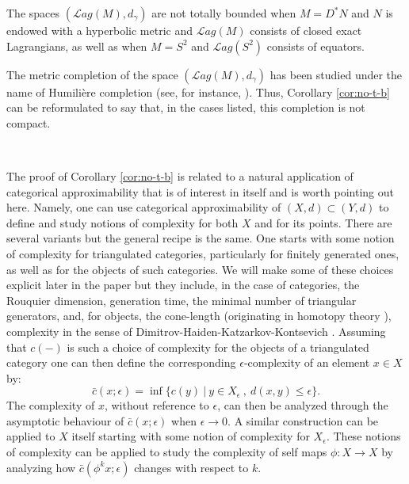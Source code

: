 \begin{cor}\label{cor:no-t-b} The spaces $(\mathcal{L}ag(M),d_{\gamma})$ are not totally bounded when
$M=D^{\ast}N$ and $N$ is endowed with a hyperbolic metric and $\mathcal{L}ag(M)$ consists of closed exact Lagrangians, as well as when $M=S^{2}$ and $\mathcal{L}ag(S^{2})$ consists of equators.
\end{cor}

The metric completion  of the space $(\mathcal{L}ag(M),d_{\gamma})$ has been studied under 
the name of Humili\`ere completion (see, for instance, \cite{AGHI:micro}). Thus, Corollary \ref{cor:no-t-b} can be reformulated to say that, in the cases listed, this completion is not compact.

\

The proof of Corollary \ref{cor:no-t-b} is related to a natural application of categorical approximability that is of interest in itself and is worth pointing out here. Namely, one can use categorical approximability of $(X,d)\subset (Y,d)$ to define and study notions of complexity for both $X$ and for its points. There are several variants but the general recipe is the same. One starts with some notion of complexity for triangulated categories, particularly for finitely generated ones,  as well as for the objects of such categories. We will make some of these choices explicit later in the paper but they include, in the case of categories, the Rouquier dimension, generation time, the minimal number of triangular generators, and, for objects, the cone-length (originating in homotopy theory \cite{Gan:cat} \cite{Cor:cone-LS}), complexity in the sense of Dimitrov-Haiden-Katzarkov-Kontsevich  \cite{DHKK:dyn_cat}.  
 Assuming that $c(-)$ is such a choice of complexity for the objects of a 
 triangulated category one can then define the corresponding $\epsilon$-complexity of an element $x\in X$ by: 
 $$\bar{c}(x; \epsilon)=\inf \{ c(y) \ | \  y\in X_{\epsilon}\ ,\  d(x,y)\leq \epsilon\} .$$ The complexity of $x$, without reference to $\epsilon$, can then be analyzed through the asymptotic behaviour of $\bar{c}(x; \epsilon)$  when $\epsilon \to 0$.  A similar construction can be applied to $X$ itself starting  with some notion of complexity for $X_{\epsilon}$. These notions of complexity can be applied to study the complexity of self maps $\phi : X\to X$ by analyzing how 
 $\bar{c}(\phi^{k}x; \epsilon)$ changes with 
 respect to $k$. 
 
 \
 
